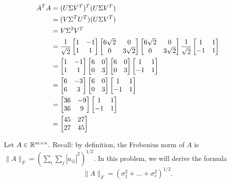 \documentclass[10pt]{exam}
\begin{document}
\begin{questions}
\begin{parts}
\begin{align*}
    A^TA &= (U \Sigma V^T)^T(U \Sigma V^T)\\
    &= (V \Sigma ^T U^T)(U \Sigma V^T)\\
    &= V \Sigma ^2 V^T\\
    &= \frac{1}{\sqrt{2}} \begin{bmatrix}1 & -1 \\ 1 & 1\end{bmatrix} \begin{bmatrix}6\sqrt{2} & 0 \\ 0 & 3\sqrt{2}\end{bmatrix} \begin{bmatrix}6\sqrt{2} & 0 \\ 0 & 3\sqrt{2}\end{bmatrix} \frac{1}{\sqrt{2}} \begin{bmatrix}1 & 1 \\ -1 & 1\end{bmatrix}\\
    &= \begin{bmatrix}1 & -1 \\ 1 & 1\end{bmatrix} \begin{bmatrix}6 & 0 \\ 0 & 3\end{bmatrix} \begin{bmatrix}6 & 0 \\ 0 & 3\end{bmatrix} \begin{bmatrix}1 & 1 \\ -1 & 1\end{bmatrix}\\
    &= \begin{bmatrix}6 & -3 \\ 6 & 3\end{bmatrix} \begin{bmatrix}6 & 0 \\ 0 & 3\end{bmatrix} \begin{bmatrix}1 & 1 \\ -1 & 1\end{bmatrix}\\
    &= \begin{bmatrix}36 & -9 \\ 36 & 9\end{bmatrix} \begin{bmatrix}1 & 1 \\ -1 & 1\end{bmatrix}\\
    &= \begin{bmatrix}45 & 27 \\ 27 & 45\end{bmatrix}
\end{align*}

\end{parts}

\pagebreak

\question [10] Let $A \in \mathbb{R}^{m\times n}. $ Recall: by definition, the Frobenius norm of $A$ is $\|A\|_F = \left( \sum_i\sum_j |a_{ij}|^2 \right)^{1/2}$. In this problem, we will derive the formula $$\|A\|_F=  \left(\sigma_1^2 + \dots + \sigma_r^2 \right)^{1/2}. $$ 
\end{questions}
\end{document}
